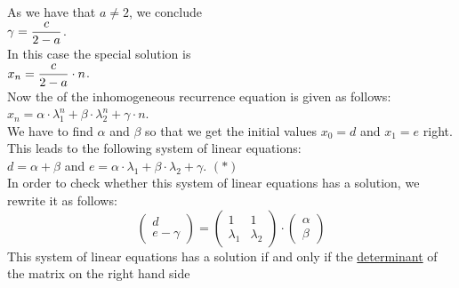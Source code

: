 \begin{enumerate}
\begin{enumerate}
            As we have that $a \not= 2$, we conclude
            \\[0.2cm]
            \hspace*{1.3cm}
            $\displaystyle \gamma = \frac{c}{2 - a}$.
            \\[0.2cm]
            In this case the special solution is
            \\[0.2cm]
            \hspace*{1.3cm}
            $\displaystyle x_n = \frac{c}{2 - a} \cdot n$.
            \\[0.2cm]
            Now the  of the inhomogeneous recurrence equation is given as follows:
            \\[0.2cm]
            \hspace*{1.3cm}
            $x_n = \alpha \cdot \lambda_1^n + \beta \cdot \lambda_2^n + \gamma \cdot n$.
            \\[0.2cm]
            We have to find $\alpha$ and $\beta$ so that we get the initial values $x_0 = d$ and $x_1 = e$ right.
            This leads to the following system of linear equations:
            \\[0.2cm]
            \hspace*{1.3cm}
            $d = \alpha + \beta$ \quad and \quad $e = \alpha \cdot \lambda_1 + \beta \cdot \lambda_2 +
            \gamma$. \hspace*{\fill} $(*)$
            \\[0.2cm]
            In order to check whether this system of linear equations has a solution, we rewrite it as follows:
            $$
            \left(
              \begin{array}{c}
                d          \\
                e - \gamma
              \end{array}
            \right) =
            \left(
              \begin{array}{cc}
                1         &  1        \\
                \lambda_1 & \lambda_2 
              \end{array}
            \right) \cdot \left(
              \begin{array}{c}
                \alpha \\
                \beta
              \end{array}
              \right)
            $$
            This system of linear equations has a solution if and only if the
            \href{https://en.wikipedia.org/wiki/Determinant}{determinant} of the matrix on the right hand side

\end{enumerate}
\end{enumerate}
